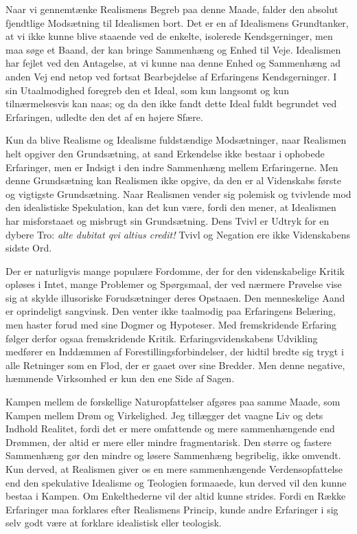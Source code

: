 \documentclass[12pt,a4paper]{article}
\begin{document}
Naar vi gennemtænke Realismens Begreb paa denne Maade, falder den
absolut fjendtlige Modsætning til Idealismen bort. Det er en af
Idealismens Grundtanker, at vi ikke kunne blive staaende ved de
enkelte, isolerede Kendsgerninger, men maa søge et Baand, der kan
bringe Sammenhæng og Enhed til Veje. Idealismen har fejlet ved den
Antagelse, at vi kunne naa denne Enhed og Sammenhæng ad anden Vej end
netop ved fortsat Bearbejdelse af Erfaringens Kendsgerninger. I sin
Utaalmodighed foregreb den et Ideal, som kun langsomt og kun
tilnærmelsesvis kan naas; og da den ikke fandt dette Ideal fuldt
begrundet ved Erfaringen, udledte den det af en højere Sfære.

Kun da blive Realisme og Idealisme fuldstændige Modsætninger, naar
Realismen helt opgiver den Grundsætning, at sand Erkendelse ikke bestaar
i ophobede Erfaringer, men er Indsigt i den indre Sammenhæng mellem
Erfaringerne. Men denne Grundsætning kan Realismen ikke opgive, da den
er al Videnskabs første og vigtigste Grundsætning. Naar Realismen vender
sig polemisk og tvivlende mod den idealistiske Spekulation, kan det kun
være, fordi den mener, at Idealismen har misforstaaet og misbrugt sin
Grundsætning. Dens Tvivl er Udtryk for en dybere Tro: \textit{alte
dubitat qvi altius credit!} Tvivl og Negation ere ikke Videnskabens
sidste Ord.

Der er naturligvis mange populære Fordomme, der for den videnskabelige
Kritik opløses i Intet, mange Problemer og Spørgsmaal, der ved nærmere
Prøvelse vise sig at skylde illusoriske Forudsætninger deres Opstaaen.
Den menneskelige Aand er oprindeligt sangvinsk. Den venter ikke
taalmodig paa Erfaringens Belæring, men haster forud med sine Dogmer og
Hypoteser. Med fremskridende Erfaring følger derfor ogsaa fremskridende
Kritik. Erfaringsvidenskabens Udvikling medfører en Inddæmmen af
Forestillingsforbindelser, der hidtil bredte sig trygt i alle Retninger
som en Flod, der er gaaet over sine Bredder. Men denne negative,
hæmmende Virksomhed er kun den ene Side af Sagen.

Kampen mellem de forskellige Naturopfattelser afgøres paa samme Maade,
som Kampen mellem Drøm og Virkelighed. Jeg tillægger det vaagne Liv og
dets Indhold Realitet, fordi det er mere omfattende og mere
sammenhængende end Drømmen, der altid er mere eller mindre
fragmentarisk. Den større og fastere Sammenhæng gør den mindre og løsere
Sammenhæng begribelig, ikke omvendt. Kun derved, at Realismen giver os
en mere sammenhængende Verdensopfattelse end den spekulative Idealisme
og Teologien formaaede, kun derved vil den kunne bestaa i Kampen. Om
Enkelthederne vil der altid kunne strides. Fordi en Række Erfaringer maa
forklares efter Realismens Princip, kunde andre Erfaringer i sig selv
godt være at forklare idealistisk eller teologisk.
\end{document}
